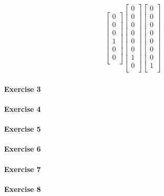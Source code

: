 \documentclass[a4paper,10pt]{article}
\begin{document}
\begin{equation*}
\begin{aligned}
{\begin{bmatrix}
0 \\
0 \\
0 \\
1 \\
0 \\
0 \\
\end{bmatrix}}
{\begin{bmatrix}
0 \\
0 \\
0 \\
0 \\
0 \\
0 \\
1 \\
0 \\
\end{bmatrix}}
{\begin{bmatrix}
0 \\
0 \\
0 \\
0 \\
0 \\
0 \\
0 \\
1 \\
\end{bmatrix}}
\end{aligned}
\end{equation*}

\paragraph{Exercise 3}
\label{ex03a}
\paragraph{Exercise 4}
\label{ex04a}
\paragraph{Exercise 5}
\label{ex05a}
\paragraph{Exercise 6}
\label{ex06a}
\paragraph{Exercise 7}
\label{ex07a}
\paragraph{Exercise 8}
\label{ex08a}
\end{document}
